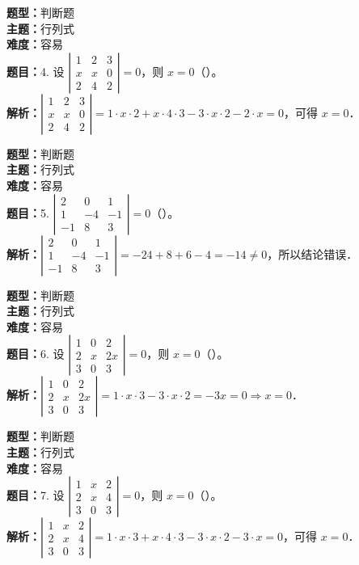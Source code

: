 \documentclass{ctexart}
\newenvironment{question}[5]{%
	\noindent\textbf{题型：}#1\\
	\textbf{主题：}#2\\
	\textbf{难度：}#3\\
	\textbf{题目：}#4\\
	\textbf{解析：}#5\\
	\vspace{1em}
}{}
\begin{document}
\begin{question}
	{判断题}
	{行列式}
	{容易}
	{4. 设 $\left|\begin{array}{lll}1 & 2 & 3 \\ x & x & 0 \\ 2 & 4 & 2\end{array}\right|=0$，则 $x=0$（）。}
	{$\left|\begin{array}{lll}1 & 2 & 3 \\ x & x & 0 \\ 2 & 4 & 2\end{array}\right|=1 \cdot x \cdot 2 + x \cdot 4 \cdot 3 - 3 \cdot x \cdot 2 - 2 \cdot x = 0$，可得 $x=0$．}
\end{question}

\begin{question}
	{判断题}
	{行列式}
	{容易}
	{5. $\left|\begin{array}{ccc}2 & 0 & 1 \\ 1 & -4 & -1 \\ -1 & 8 & 3\end{array}\right|=0$（）。}
	{$\left|\begin{array}{ccc}2 & 0 & 1 \\ 1 & -4 & -1 \\ -1 & 8 & 3\end{array}\right| = -24 + 8 + 6 - 4 = -14 \ne 0$，所以结论错误．}
\end{question}

\begin{question}
	{判断题}
	{行列式}
	{容易}
	{6. 设 $\left|\begin{array}{ccc}1 & 0 & 2 \\ 2 & x & 2x \\ 3 & 0 & 3\end{array}\right|=0$，则 $x=0$（）。}
	{$\left|\begin{array}{ccc}1 & 0 & 2 \\ 2 & x & 2x \\ 3 & 0 & 3\end{array}\right|=1 \cdot x \cdot 3 - 3 \cdot x \cdot 2 = -3x=0 \Rightarrow x=0$．}
\end{question}

\begin{question}
	{判断题}
	{行列式}
	{容易}
	{7. 设 $\left|\begin{array}{lll}1 & x & 2 \\ 2 & x & 4 \\ 3 & 0 & 3\end{array}\right|=0$，则 $x=0$（）。}
	{$\left|\begin{array}{lll}1 & x & 2 \\ 2 & x & 4 \\ 3 & 0 & 3\end{array}\right| = 1 \cdot x \cdot 3 + x \cdot 4 \cdot 3 - 3 \cdot x \cdot 2 - 3 \cdot x = 0$，可得 $x=0$．}
\end{question}
\end{document}
